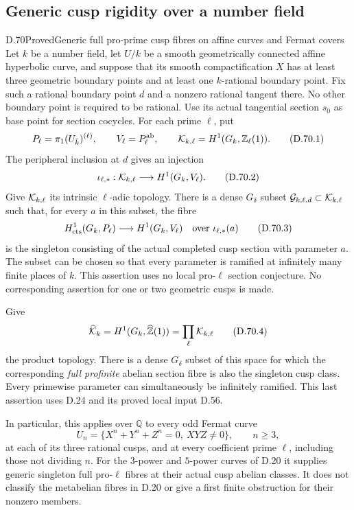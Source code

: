 \subsection{Generic cusp rigidity over a number field}

\begin{statement}{D.70}{Proved}{Generic full pro-prime cusp fibres on affine curves and Fermat covers}
Let \(k\) be a number field, let \(U/k\) be a smooth geometrically
connected affine hyperbolic curve, and suppose that its smooth
compactification \(X\) has at least three geometric boundary
points and at least one \(k\)-rational boundary point.
Fix such a rational boundary point \(d\) and a nonzero rational
tangent there. No other boundary point is required to be rational. Use its
actual tangential section \(s_0\) as base point for section cocycles.
For each prime \(\ell\), put
\[
 P_\ell=\pi_1(U_{\bar k})^{(\ell)},\qquad
 V_\ell=P_\ell^{\rm ab},\qquad
 {\cal K}_{k,\ell}=H^1(G_k,\mathbb Z_\ell(1)).
                                                        \tag{D.70.1}
\]
The peripheral inclusion at \(d\) gives an injection
\[
 \iota_{\ell,*}:{\cal K}_{k,\ell}
                    \longrightarrow H^1(G_k,V_\ell).   \tag{D.70.2}
\]
Give \({\cal K}_{k,\ell}\) its intrinsic \(\ell\)-adic topology.
There is a dense \(G_\delta\) subset
\({\cal G}_{k,\ell,d}\subset{\cal K}_{k,\ell}\) such that, for
every \(a\) in this subset, the fibre
\[
 H^1_{\rm cts}(G_k,P_\ell)\longrightarrow H^1(G_k,V_\ell)
           \quad\hbox{over }\iota_{\ell,*}(a)             \tag{D.70.3}
\]
is the singleton consisting of the actual completed cusp section
with parameter \(a\). The subset can be chosen so that every
parameter is ramified at infinitely many finite places of \(k\).
This assertion uses no local pro-\(\ell\) section conjecture.
No corresponding assertion for one or two geometric cusps is made.

Give
\[
 \widehat{\cal K}_k=H^1(G_k,\widehat{\mathbb Z}(1))
                    =\prod_\ell{\cal K}_{k,\ell}         \tag{D.70.4}
\]
the product topology. There is a dense \(G_\delta\) subset of this
space for which the corresponding \emph{full profinite} abelian
section fibre is also the singleton cusp class. Every primewise
parameter can simultaneously be infinitely ramified. This last
assertion uses D.24 and its proved local input D.56.

In particular, this applies over \(\mathbb Q\) to every odd
Fermat curve
\[
 U_n=\{X^n+Y^n+Z^n=0,\ XYZ\ne0\},\qquad n\ge3,
                                                        \tag{D.70.5}
\]
at each of its three rational cusps, and at every coefficient
prime \(\ell\), including those not dividing \(n\). For the
\(3\)-power and \(5\)-power curves of D.20 it supplies generic
singleton full pro-\(\ell\) fibres at their actual cusp abelian
classes. It does not classify the metabelian fibres in D.20
or give a first finite obstruction for their nonzero members.
\end{statement}

